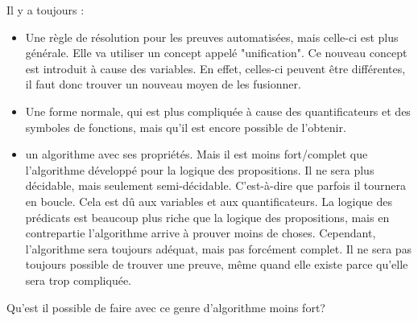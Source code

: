 Il y a toujours :
\begin{itemize}
  \item Une règle de résolution pour les preuves automatisées, mais celle-ci est plus générale. Elle va utiliser un concept appelé "unification". Ce nouveau concept est introduit à cause des variables. En effet, celles-ci peuvent être différentes, il faut donc trouver un nouveau moyen de les fusionner.
  \item Une forme normale, qui  est plus compliquée à cause des quantificateurs et des symboles de fonctions, mais qu'il est encore possible de l'obtenir.
  \item un algorithme avec ses propriétés. Mais il est moins fort/complet que l'algorithme développé pour la logique des propositions. Il ne sera plus décidable, mais seulement semi-décidable. C'est-à-dire que parfois il tournera en boucle. Cela est dû aux variables et aux quantificateurs. La logique des prédicats est beaucoup plus riche que la logique des propositions, mais en contrepartie l'algorithme arrive à prouver moins de choses. Cependant, l'algorithme sera toujours adéquat, mais pas forcément complet. Il ne sera pas toujours possible de trouver une preuve, même quand elle existe parce qu'elle sera trop compliquée.
\end{itemize}
Qu'est il possible de faire avec ce genre d'algorithme moins fort?

